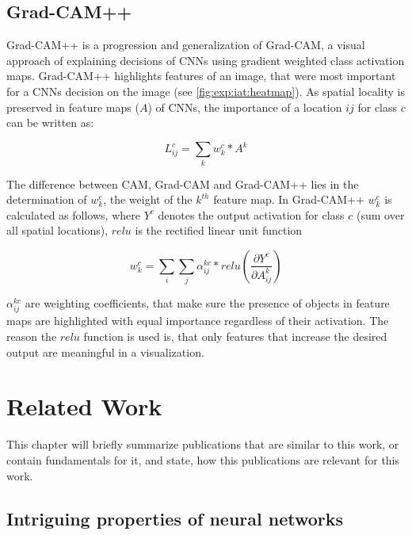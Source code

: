 \documentclass[draft,final]{vutinfth} %
\begin{document}
\section{Grad-CAM++}

Grad-CAM++ is a progression and generalization of Grad-CAM, a visual approach of explaining decisions of CNNs using gradient weighted class activation maps.
Grad-CAM++ highlights features of an image, that were most important for a CNNs decision on the image (see \ref{fig:exp:iat:heatmap}).
As spatial locality is preserved in feature maps ($A$) of CNNs, the importance of a location $i j$ for class $c$ can be written as:

\begin{equation}
	L_{ij}^c = \sum_{k} w_k^c * A^k
\end{equation}

The difference between CAM, Grad-CAM and Grad-CAM++ lies in the determination of $w_k^c$, the weight of the $k^{th}$ feature map.
In Grad-CAM++ $w_k^c$ is calculated as follows, where $Y^c$ denotes the output activation for class $c$ (sum over all spatial locations), $relu$ is the rectified linear unit function

\begin{equation}
	w_k^c = \sum_i \sum_j \alpha_{ij}^{kc} * relu(\frac{\partial Y^c}{\partial A_{ij}^k})
\end{equation}

$\alpha_{ij}^{kc}$ are weighting coefficients, that make sure the presence of objects in feature maps are highlighted with equal importance regardless of their activation.
The reason the $relu$ function is used is, that only features that increase the desired output are meaningful in a visualization.
\cite{Chattopadhyay2017}
\label{section:grad_cam}

\chapter{Related Work}

This chapter will briefly summarize publications that are similar to this work, or contain fundamentals for it, and state, how this publications are relevant for this work.

\section{Intriguing properties of neural networks}
\end{document}

